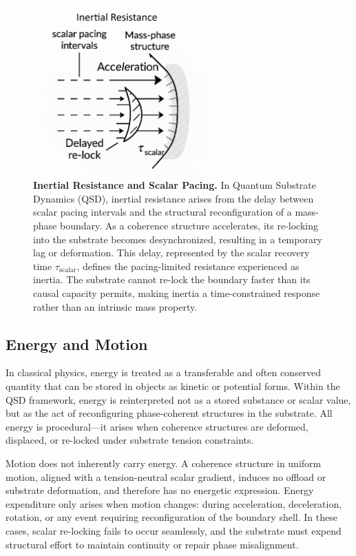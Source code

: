 \documentclass[entropy,article,submit,pdftex,moreauthors]{Definitions/mdpi}
\begin{document}
\begin{figure}[H]
    \centering
    \includegraphics[width=0.6\textwidth]{figures/inertia.png}
    \caption{
    \textbf{Inertial Resistance and Scalar Pacing.}
    In Quantum Substrate Dynamics (QSD), inertial resistance arises from the delay between scalar pacing intervals and the structural reconfiguration of a mass-phase boundary. As a coherence structure accelerates, its re-locking into the substrate becomes desynchronized, resulting in a temporary lag or deformation. This delay, represented by the scalar recovery time \( \tau_{\text{scalar}} \), defines the pacing-limited resistance experienced as inertia. The substrate cannot re-lock the boundary faster than its causal capacity permits, making inertia a time-constrained response rather than an intrinsic mass property.
    }
    \label{fig:inertial-resistance}
\end{figure}

\subsection{Energy and Motion}

In classical physics, energy is treated as a transferable and often conserved quantity that can be stored in objects as kinetic or potential forms. Within the QSD framework, energy is reinterpreted not as a stored substance or scalar value, but as the act of reconfiguring phase-coherent structures in the substrate. All energy is procedural---it arises when coherence structures are deformed, displaced, or re-locked under substrate tension constraints.

Motion does not inherently carry energy. A coherence structure in uniform motion, aligned with a tension-neutral scalar gradient, induces no offload or substrate deformation, and therefore has no energetic expression. Energy expenditure only arises when motion changes: during acceleration, deceleration, rotation, or any event requiring reconfiguration of the boundary shell. In these cases, scalar re-locking fails to occur seamlessly, and the substrate must expend structural effort to maintain continuity or repair phase misalignment.
\end{document}
